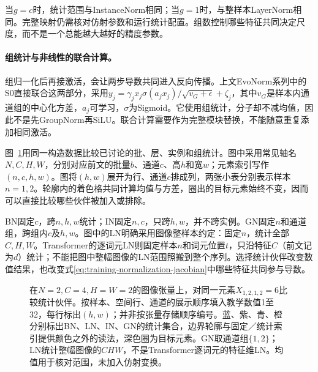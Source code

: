 当$g=c$时，统计范围与InstanceNorm相同；当$g=1$时，与整样本LayerNorm相同。完整映射仍需核对仿射参数和运行统计配置。组数控制哪些特征共同决定尺度，而不是一个总能越大越好的精度参数。

\paragraph{组统计与非线性的联合计算。}

组归一化后再接激活，会让两步导数共同进入反向传播。上文EvoNorm系列中的S0直接联合这两部分，采用$y_j=\gamma_jx_j\sigma(a_jx_j)/\sqrt{v_G+\epsilon}+\zeta_j$，其中$v_G$是样本内通道组的中心化方差，$a_j$可学习，$\sigma$为Sigmoid。它使用组统计，分子却不减均值，因此不是先GroupNorm再SiLU。联合计算需要作为完整模块替换，不能随意重复添加相同激活。

图~\ref{fig:training-normalization-axes}用同一构造数据比较已讨论的批、层、实例和组统计。图中采用常见轴名$N,C,H,W$，分别对应前文的批量$b$、通道$c$、高$h$和宽$w$；元素索引写作$(n,c,h,w)$。图将$(h,w)$展开为行、通道$c$排成列，两张小表分别表示样本$n=1,2$。轮廓内的着色格共同计算均值与方差，圈出的目标元素始终不变，因而可以直接比较哪些伙伴被加入或排除。

BN固定$c$，跨$n,h,w$统计；IN固定$n,c$，只跨$h,w$，并不跨实例。GN固定$n$和通道组，跨组内$c$及$h,w$。图中的LN明确采用图像整样本约定：固定$n$，统计全部$C,H,W$。Transformer的逐词元LN则固定样本$n$和词元位置$t$，只沿特征$C$（前文记为$d$）统计；不能把图中整幅图像的LN范围照搬到整个序列。选择统计伙伴改变数值结果，也改变式\eqref{eq:training-normalization-jacobian}中哪些特征共同参与导数。
\begin{figure}[htbp]
  \centering
  
  \caption{在$N=2,C=4,H=W=2$的图像张量上，对同一元素$X_{1,2,1,2}=6$比较统计伙伴。按样本、空间行、通道的展示顺序填入教学数值1至32，每行标出$(h,w)$；并非按张量存储顺序编号。蓝、紫、青、橙分别标出BN、LN、IN、GN的统计集合，边界轮廓与固定／统计索引提供颜色之外的读法，深色圈为目标元素。GN取通道组$\{1,2\}$；LN统计整幅图像的$CHW$，不是Transformer逐词元的特征维LN。均值用于核对范围，未加入仿射变换。}
  \label{fig:training-normalization-axes}
\end{figure}
\FloatBarrier

